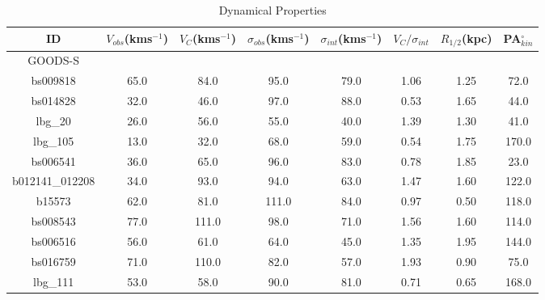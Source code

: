 \documentclass[fleqn,usenatbib]{mn2e}
\begin{document}
\begin{table*}
\centering
\begin{threeparttable}
\caption{Dynamical Properties}
\label{tab:kin_props}
\begin{tabular}{cccccccc}

 \hline
ID & $V_{obs}$(kms$^{-1}$) & $V_{C}$(kms$^{-1}$) & $\sigma_{obs}$(kms$^{-1}$) & $\sigma_{int}$(kms$^{-1}$) & $V_{C}/\sigma_{int}$ & $R_{1/2}$(kpc) & PA$_{kin}^{\circ}$ \\
 \hline
 GOODS-S & & & & & & & \\
 \hline
bs009818        & 65.0                    & 84.0                     & 95.0                  & 79.0                   & 1.06       & 1.25        & 72.0 \\
bs014828        & 32.0                    & 46.0                     & 97.0                  & 88.0                   & 0.53       & 1.65      & 44.0   \\
lbg\_20         & 26.0                    & 56.0                     & 55.0                  & 40.0                   & 1.39      & 1.30        & 41.0  \\
lbg\_105        & 13.0                    & 32.0                     & 68.0                  & 59.0                   & 0.54       & 1.75       & 170.0 \\
bs006541        & 36.0                    & 65.0                     & 96.0                  & 83.0                   & 0.78        & 1.85       & 23.0 \\
b012141\_012208 & 34.0                    & 93.0                     & 94.0                  & 63.0                   & 1.47       & 1.60       & 122.0 \\
b15573          & 62.0                    & 81.0                     & 111.0                 & 84.0                   & 0.97        & 0.50       & 118.0 \\
bs008543        & 77.0                    & 111.0                    & 98.0                  & 71.0                   & 1.56       & 1.60       & 114.0 \\
bs006516        & 56.0                    & 61.0                     & 64.0                  & 45.0                   & 1.35      & 1.95       & 144.0  \\
bs016759        & 71.0                    & 110.0                    & 82.0                  & 57.0                   & 1.93        & 0.90       & 75.0 \\
lbg\_111        & 53.0                    & 58.0                     & 90.0                  & 81.0                   & 0.71      & 0.65        & 168.0 \\

\end{tabular}
\end{threeparttable}
\end{table*}
\end{document}
